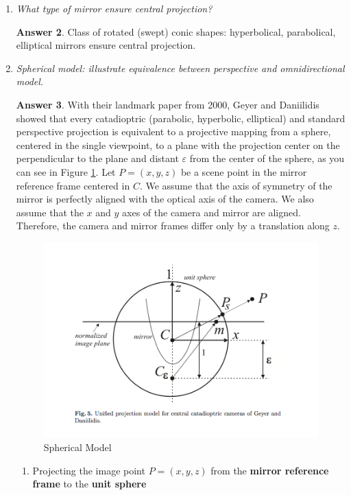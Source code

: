 \documentclass[a4paper,12 pt]{article}
\theoremstyle{definition}
\theoremstyle{remark}
\theoremstyle{definition}
\theoremstyle{definition}
\theoremstyle{definition}
\theoremstyle{definition}
\theoremstyle{remark}
\theoremstyle{remark}
\theoremstyle{definition}
\theoremstyle{definition}
\newtheorem*{answer}{Answer}
\begin{document}
\begin{enumerate}
\begin{enumerate}
\begin{answer}
\begin{figure}[tbh]
\end{figure}
\end{answer}
\item \textit{What type of mirror ensure central projection?}
\begin{answer}
Class of rotated (swept) conic shapes: hyperbolical, parabolical, elliptical mirrors ensure central projection.
\end{answer}
\item \textit{Spherical model: illustrate equivalence between perspective and omnidirectional model.}
\begin{answer}
With their landmark paper from 2000, Geyer and Daniilidis showed that every catadioptric (parabolic, hyperbolic, elliptical) and standard perspective projection is equivalent to a projective mapping from a sphere, centered in the single viewpoint, to a plane with the projection center on the perpendicular to the plane and distant $\varepsilon$ from the center of the sphere, as you can see in Figure \ref{fig:sphere}. Let $P=(x,y,z)$ be a scene point in the mirror reference frame centered in $C$. We assume that the axis of symmetry of the mirror is perfectly aligned with the optical axis of the camera. We also assume that the $x$ and $y$ axes of the camera and mirror are aligned. Therefore, the camera and mirror frames differ only by a translation along $z$.
 \begin{figure}[tbh]
\begin{center}
\includegraphics[scale=0.6]{pics/sphere}
\caption{Spherical Model\label{fig:sphere}}
\end{center}
\end{figure}
\begin{enumerate}
\item Projecting the image point $P=(x,y,z)$ from the \textbf{ mirror reference frame} to the \textbf{unit sphere}

\end{enumerate}
\end{answer}
\end{enumerate}
\end{enumerate}
\end{document}
